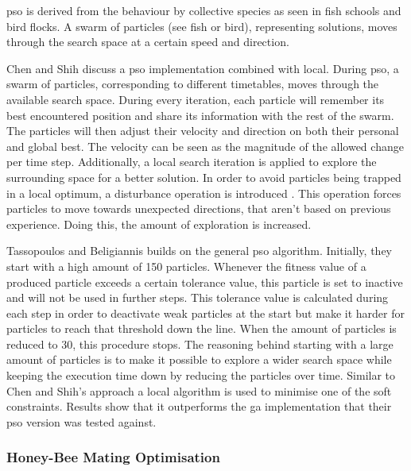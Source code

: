 \acrfull{pso} \cite{kennedy1995} is derived from the behaviour by collective species as seen in fish schools and bird flocks. A swarm of particles (see fish or bird), representing solutions, moves through the search space at a certain speed and direction.

Chen and Shih \cite{Chen2013} discuss a \acrlong{pso} implementation combined with \acrlong{local}. During \acrshort{pso}, a swarm of particles, corresponding to different timetables, moves through the available search space. During every iteration, each particle will remember its best encountered position and share its information with the rest of the swarm. The particles will then adjust their velocity and direction on both their personal and global best. The velocity can be seen as the magnitude of the allowed change per time step. Additionally, a local search iteration is applied to explore the surrounding space for a better solution. In order to avoid particles being trapped in a local optimum, a disturbance operation is introduced \cite{tsai2010}. This operation forces particles to move towards unexpected directions, that aren't based on previous experience. Doing this, the amount of exploration is increased.

Tassopoulos and Beligiannis \cite{Tassopoulos2012} builds on the general \acrlong{pso} algorithm. Initially, they start with a high amount of 150 particles. Whenever the fitness value of a produced particle exceeds a certain tolerance value, this particle is set to inactive and will not be used in further steps. This tolerance value is calculated during each step in order to deactivate weak particles at the start but make it harder for particles to reach that threshold down the line. When the amount of particles is reduced to 30, this procedure stops. The reasoning behind starting with a large amount of particles is to make it possible to explore a wider search space while keeping the execution time down by reducing the particles over time. Similar to Chen and Shih's approach \cite{Chen2013} a \acrlong{local} algorithm is used to minimise one of the soft constraints. Results show that it outperforms the \acrfull{ga} implementation that their \acrshort{pso} version was tested against.
\subsubsection{Honey-Bee Mating Optimisation}


